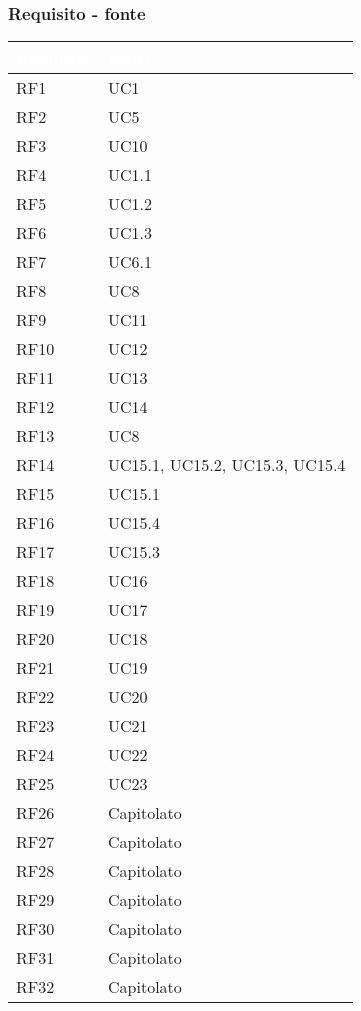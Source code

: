 \subsubsection{Requisito - fonte}
{
      \setlength{\freewidth}{\dimexpr\textwidth-0\tabcolsep}
      \renewcommand{\arraystretch}{1.5}
      \centering
      \setlength{\aboverulesep}{0pt}
      \setlength{\belowrulesep}{0pt}
      \begin{longtable}{C{.47\freewidth} C{.47\freewidth}}
         \toprule
      \textcolor{white}{\textbf{Requisito}}&
      \textcolor{white}{\textbf{Fonti}}\\
      \toprule
      \endhead
      
      RF1 & UC1\\
      RF2 & UC5\\
      RF3 & UC10\\
      RF4 & UC1.1\\
      RF5 & UC1.2\\
      RF6 & UC1.3\\
      RF7 & UC6.1\\
      RF8 & UC8\\
      RF9 & UC11\\
      RF10 & UC12\\
      RF11 & UC13\\
      RF12 & UC14\\
      RF13 & UC8\\
      RF14 & UC15.1, UC15.2, UC15.3, UC15.4\\
      RF15 & UC15.1\\
      RF16 & UC15.4\\
      RF17 & UC15.3\\
      RF18 & UC16\\
      RF19 & UC17\\
      RF20 & UC18\\
      RF21 & UC19\\
      RF22 & UC20\\
      RF23 & UC21\\
      RF24 & UC22\\
      RF25 & UC23\\
      RF26 & Capitolato\\
      RF27 & Capitolato\\
      RF28 & Capitolato\\
      RF29 & Capitolato\\
      RF30 & Capitolato\\
      RF31 & Capitolato\\
      RF32 & Capitolato\\


\end{longtable}}
